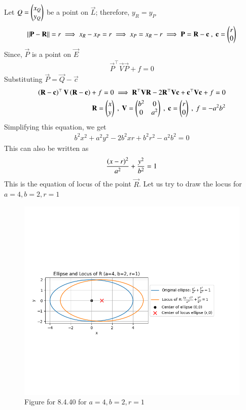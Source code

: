 \documentclass[journal,12pt,onecolumn]{IEEEtran}
\theoremstyle{remark}
\begin{document}
Let $Q=\begin{pmatrix}x_Q \\ y_Q\end{pmatrix}$ be a point on $\vec{L}$; therefore, $y_R=y_P$ 
\begin{align}
    \left\lVert\mathbf{P}-\mathbf{R}\right\rVert=r \implies x_R - x_P =r \implies x_P = x_R - r \implies \mathbf{P} = \mathbf{R} -\mathbf{c}\  ,\  \mathbf{c}=\begin{pmatrix}r \\ 0\end{pmatrix}
\end{align}
Since, $\vec{P}$ is a point on $\vec{E}$
\begin{align}
    \vec{P}^{\top}\vec{V}\vec{P} + f=0
\end{align}
Substituting $\vec{P} = \vec{Q} -\vec{c}$
\begin{align}
    \left(\mathbf{R} -\mathbf{c}\right)^{\top}\mathbf{V}\left(\mathbf{R} -\mathbf{c}\right) + f=0 \implies \mathbf{R}^{\top}\mathbf{V}\mathbf{R} - 2\mathbf{R}^{\top}\mathbf{V}\mathbf{c} + \mathbf{c}^{\top}\mathbf{V}\mathbf{c}+f=0\\
    \mathbf{R}= \begin{pmatrix}x\\y\end{pmatrix} \ , \ \mathbf{V}=\begin{pmatrix}b^2 & 0 \\ 0 & a^2\end{pmatrix} \ , \ \mathbf{c}=\begin{pmatrix}r\\0\end{pmatrix} \ , \ f=-a^2b^2
\end{align}
Simplifying this equation, we get
\begin{align}
    b^2x^2 + a^2y^2 - 2b^2 xr + b^2r^2 - a^2b^2=0
\end{align}
This can also be written as 
\begin{align}
    \dfrac{\left(x-r\right)^2}{a^2} + \dfrac{y^2}{b^2} =1
\end{align}
This is the equation of locus of the point $\vec{R}$.
Let us try to draw the locus for $a=4, b=2 , r=1 $
\begin{figure}[H]
        \centering
        \includegraphics[width=1\columnwidth]{figs/1.png}
        \caption{Figure for 8.4.40 for $a=4, b=2, r=1$}
        \label{fig:placeholder}
    \end{figure}
\end{document}

